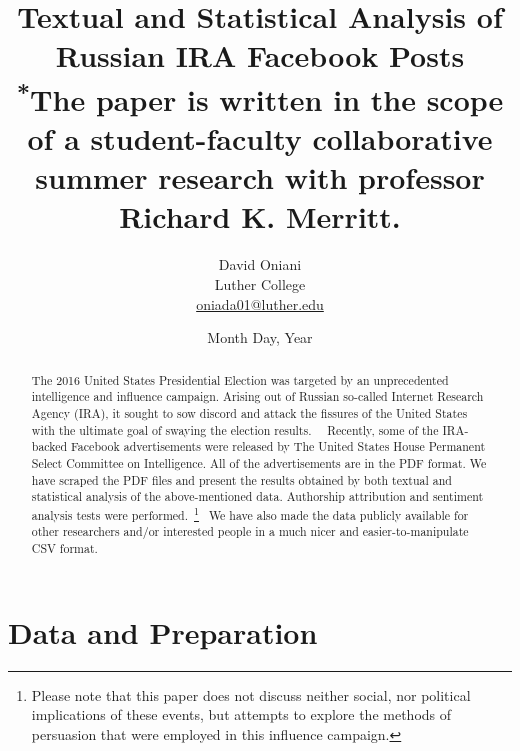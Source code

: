 \documentclass[12pt]{article}
\author{David Oniani\\
        Luther College\\
        \href{mailto:oniada01@luther.edu}{oniada01@luther.edu}}
\title{\textbf{Textual and Statistical Analysis of Russian IRA Facebook Posts}\\
      \small \textsuperscript{*}The paper is written in the scope of a student-faculty collaborative\\
                                summer research with professor Richard K. Merritt.}
\date{Month Day, Year}
\theoremstyle{definition}
\begin{document}
\maketitle


\begin{abstract}

\noindent The 2016 United States Presidential Election was targeted by an
unprecedented intelligence and influence campaign. Arising out of Russian
so-called Internet Research Agency (IRA), it sought to sow discord and attack
the fissures of the United States with the ultimate goal of swaying the
election results.~\cite{ira2016}~\cite{ira2016data} Recently, some of the
IRA-backed Facebook advertisements were released by The United States House
Permanent Select Committee on Intelligence. All of the advertisements are in
the PDF format. We have scraped the PDF files and present the results obtained
by both textual and statistical analysis of the above-mentioned data. Authorship
attribution and sentiment analysis tests were performed.~\footnote{Please note
that this paper does not discuss neither social, nor political implications of
these events, but attempts to explore the methods of persuasion that were
employed in this influence campaign.}~\cite{ira2016csvdata} We have also made
the data publicly available for other researchers and/or interested people in
a much nicer and easier-to-manipulate CSV format.
\end{abstract}


\newpage
\tableofcontents
\newpage


\section*{\centering Data and Preparation}
\end{document}
